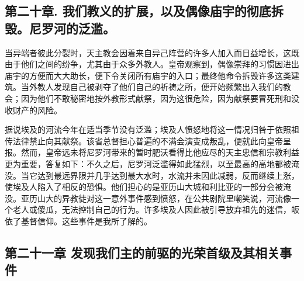
\subsection{第二十章. 我们教义的扩展，以及偶像庙宇的彻底拆毁。尼罗河的泛滥。}

当异端者彼此分裂时，天主教会因着来自异己阵营的许多人加入而日益增长，这既由于他们之间的纷争，尤其由于众多外教人。皇帝观察到，偶像崇拜的习惯因进出庙宇的方便而大大助长，便下令关闭所有庙宇的入口；最终他命令拆毁许多这类建筑。当外教人发现自己被剥夺了他们自己的祈祷之所，便开始频繁出入我们的教会；因为他们不敢秘密地按外教形式献祭，因为这很危险，因为献祭要冒死刑和没收财产的风险。\par

据说埃及的河流今年在适当季节没有泛滥；埃及人愤怒地将这一情况归咎于依照祖传法律禁止向其献祭。该省总督担心普遍的不满会演变成叛乱，便就此向皇帝呈报。然而，皇帝远未将尼罗河带来的暂时肥沃看得比他应尽的天主忠信和宗教利益更为重要，答复如下：不久之后，尼罗河泛滥得如此猛烈，以至最高的高地都被淹没。当它达到最远界限并几乎达到最大水时，水流并未因此减弱，反而继续上涨，使埃及人陷入了相反的恐惧。他们担心的是亚历山大城和利比亚的一部分会被淹没。亚历山大的异教徒对这一意外事件感到愤怒，在公共剧院里嘲笑说，河流像一个老人或傻瓜，无法控制自己的行为。许多埃及人因此被引导放弃祖先的迷信，皈依了基督信仰。这些事件是我所了解的。\par


\subsection{第二十一章 发现我们主的前驱的光荣首级及其相关事件}

